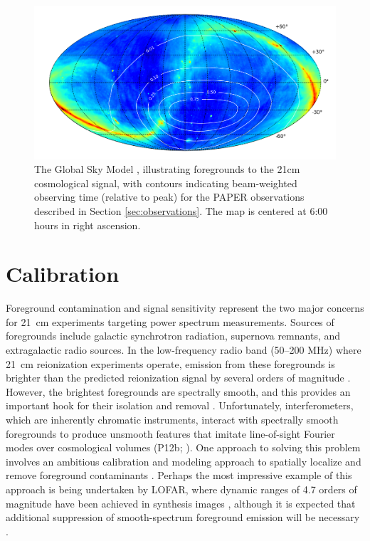 \documentclass[twocolumn,numberedappendix]{emulateapj} \shorttitle{New Limits on the 21 cm Power Spectrum at $z=8.4$}
\begin{document}
\begin{figure}\centering
\includegraphics[width=2\columnwidth]{plots/coverage.png}
\caption{The Global Sky Model \citep{deoliveira2008}, illustrating foregrounds to the 21cm
cosmological signal, with 
contours indicating beam-weighted observing time (relative to peak) for the PAPER observations
described in Section \ref{sec:observations}.  The map is centered at 6:00 hours in right ascension.
}\label{fig:coverage}
\end{figure}


\section{Calibration}\label{sec:calib}

Foreground contamination and signal sensitivity represent the two major concerns for 21~cm
experiments targeting power spectrum measurements. Sources of foregrounds include
galactic synchrotron radiation, supernova remnants, and extragalactic radio sources.
In the low-frequency radio band (50--200 MHz) where 21~cm reionization
experiments operate, emission from these foregrounds is brighter than the
predicted reionization signal by several orders of magnitude
\citep{santos_et_al2005,ali_et_al2008,deoliveira2008,jelic_et_al2008,bernardi_et_al2009,bernardi_et_al2010,ghosh_et_al2011}.
However, the brightest foregrounds are spectrally smooth, and this provides an
important hook for their isolation and removal
\citep{liu_et_al2009,petrovic_oh2011,liu_tegmark2012}.  Unfortunately,
interferometers, which are inherently chromatic
instruments, interact with spectrally smooth foregrounds to produce unsmooth features that
imitate line-of-sight Fourier modes over cosmological volumes (P12b; \citealt{bowman_et_al2009,morales_et_al2006a}).
One approach to solving this problem involves an ambitious calibration and modeling approach to spatially localize and
remove foreground contaminants 
\citep{bowman_et_al2008,liu_et_al2008,harker_et_al2009,sullivan_et_al2012,chapman_et_al2013}.
Perhaps the most impressive example of this approach is being undertaken by LOFAR, where dynamic ranges of 4.7 
orders of magnitude have
been achieved in synthesis images \citep{yatawatta_et_al2013}, although it is expected that additional
suppression of smooth-spectrum foreground emission will be necessary \citep{chapman_et_al2013}.
\end{document}
